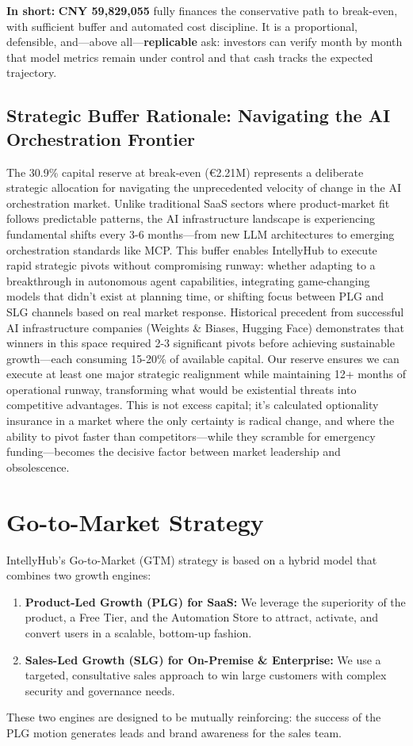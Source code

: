 \documentclass[11pt, a4paper, oneside]{article}
\begin{document}
\textbf{In short:} \textbf{CNY 59{,}829{,}055} fully finances the conservative path to break-even, with sufficient buffer and automated cost discipline. It is a proportional, defensible, and—above all—\textbf{replicable} ask: investors can verify month by month that model metrics remain under control and that cash tracks the expected trajectory.

\subsection{Strategic Buffer Rationale: Navigating the AI Orchestration Frontier}
The 30.9\% capital reserve at break-even (€2.21M) represents a deliberate strategic allocation for navigating the unprecedented velocity of change in the AI orchestration market. Unlike traditional SaaS sectors where product-market fit follows predictable patterns, the AI infrastructure landscape is experiencing fundamental shifts every 3-6 months—from new LLM architectures to emerging orchestration standards like MCP. This buffer enables IntellyHub to execute rapid strategic pivots without compromising runway: whether adapting to a breakthrough in autonomous agent capabilities, integrating game-changing models that didn't exist at planning time, or shifting focus between PLG and SLG channels based on real market response. Historical precedent from successful AI infrastructure companies (Weights \& Biases, Hugging Face) demonstrates that winners in this space required 2-3 significant pivots before achieving sustainable growth—each consuming 15-20\% of available capital. Our reserve ensures we can execute at least one major strategic realignment while maintaining 12+ months of operational runway, transforming what would be existential threats into competitive advantages. This is not excess capital; it's calculated optionality insurance in a market where the only certainty is radical change, and where the ability to pivot faster than competitors—while they scramble for emergency funding—becomes the decisive factor between market leadership and obsolescence.

\newpage
\section{Go-to-Market Strategy}

IntellyHub's Go-to-Market (GTM) strategy is based on a hybrid model that combines two growth engines:
\begin{enumerate}
    \item \textbf{Product-Led Growth (PLG) for SaaS:} We leverage the superiority of the product, a Free Tier, and the Automation Store to attract, activate, and convert users in a scalable, bottom-up fashion.
    \item \textbf{Sales-Led Growth (SLG) for On-Premise \& Enterprise:} We use a targeted, consultative sales approach to win large customers with complex security and governance needs.
\end{enumerate}
These two engines are designed to be mutually reinforcing: the success of the PLG motion generates leads and brand awareness for the sales team.
\end{document}
